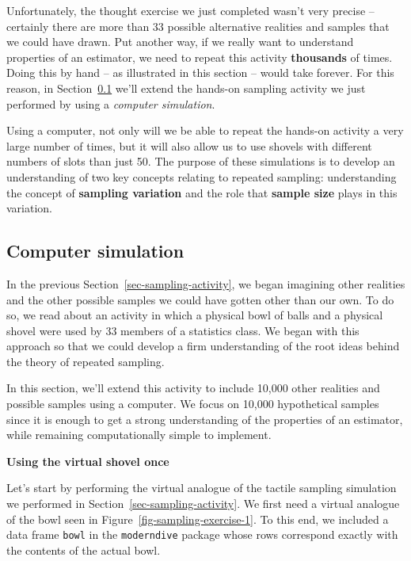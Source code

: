 \documentclass[
  letterpaper,
  DIV=11,
  numbers=noendperiod]{scrreprt}
\theoremstyle{definition}
\theoremstyle{remark}
\begin{document}
Unfortunately, the thought exercise we just completed wasn't very
precise -- certainly there are more than 33 possible alternative
realities and samples that we could have drawn. Put another way, if we
really want to understand properties of an estimator, we need to repeat
this activity \textbf{thousands} of times. Doing this by hand -- as
illustrated in this section -- would take forever. For this reason, in
Section~\ref{sec-sampling-simulation} we'll extend the hands-on sampling
activity we just performed by using a \emph{computer simulation}.

Using a computer, not only will we be able to repeat the hands-on
activity a very large number of times, but it will also allow us to use
shovels with different numbers of slots than just 50. The purpose of
these simulations is to develop an understanding of two key concepts
relating to repeated sampling: understanding the concept of
\textbf{sampling variation} and the role that \textbf{sample size} plays
in this variation.

\hypertarget{sec-sampling-simulation}{%
\subsection{Computer simulation}\label{sec-sampling-simulation}}

In the previous Section~\ref{sec-sampling-activity}, we began imagining
other realities and the other possible samples we could have gotten
other than our own. To do so, we read about an activity in which a
physical bowl of balls and a physical shovel were used by 33 members of
a statistics class. We began with this approach so that we could develop
a firm understanding of the root ideas behind the theory of repeated
sampling.

In this section, we'll extend this activity to include 10,000 other
realities and possible samples using a computer. We focus on 10,000
hypothetical samples since it is enough to get a strong understanding of
the properties of an estimator, while remaining computationally simple
to implement.

\textbf{Using the virtual shovel once}

Let's start by performing the virtual analogue of the tactile sampling
simulation we performed in Section~\ref{sec-sampling-activity}. We first
need a virtual analogue of the bowl seen in
Figure~\ref{fig-sampling-exercise-1}. To this end, we included a data
frame \texttt{bowl} in the \texttt{moderndive} package whose rows
correspond exactly with the contents of the actual bowl.
\end{document}
